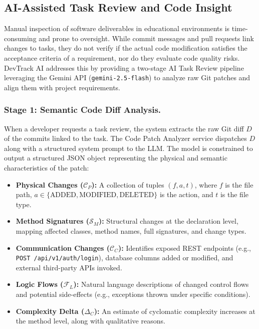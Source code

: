 \subsection{AI-Assisted Task Review and Code Insight}

Manual inspection of software deliverables in educational environments is time-consuming and prone to oversight. While commit messages and pull requests link changes to tasks, they do not verify if the actual code modification satisfies the acceptance criteria of a requirement, nor do they evaluate code quality risks. DevTrack AI addresses this by providing a two-stage AI Task Review pipeline leveraging the Gemini API (\texttt{gemini-2.5-flash}) to analyze raw Git patches and align them with project requirements.

\subsubsection{Stage 1: Semantic Code Diff Analysis.} 
When a developer requests a task review, the system extracts the raw Git diff $D$ of the commits linked to the task. The Code Patch Analyzer service dispatches $D$ along with a structured system prompt to the LLM. The model is constrained to output a structured JSON object representing the physical and semantic characteristics of the patch:
\begin{itemize}
    \item \textbf{Physical Changes ($\mathcal{C}_P$):} A collection of tuples $(f, a, t)$, where $f$ is the file path, $a \in \{\text{ADDED}, \text{MODIFIED}, \text{DELETED}\}$ is the action, and $t$ is the file type.
    \item \textbf{Method Signatures ($\mathcal{S}_M$):} Structural changes at the declaration level, mapping affected classes, method names, full signatures, and change types.
    \item \textbf{Communication Changes ($\mathcal{C}_C$):} Identifies exposed REST endpoints (e.g., \texttt{POST /api/v1/auth/login}), database columns added or modified, and external third-party APIs invoked.
    \item \textbf{Logic Flows ($\mathcal{F}_L$):} Natural language descriptions of changed control flows and potential side-effects (e.g., exceptions thrown under specific conditions).
    \item \textbf{Complexity Delta ($\Delta_C$):} An estimate of cyclomatic complexity increases at the method level, along with qualitative reasons.
\end{itemize}

